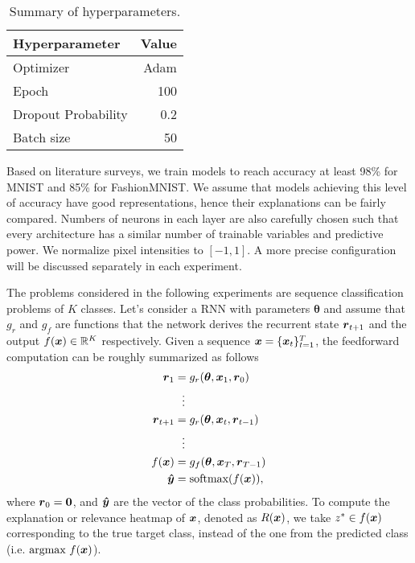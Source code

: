 \begin{table}[!htb]
\centering
\caption{Summary of hyperparameters.}
\label{tab:hyper_summary}
\begin{tabular}{l|r}
\textbf{Hyperparameter} & \multicolumn{1}{l}{\textbf{Value}} \\ \hline
Optimizer               & Adam                               \\
Epoch     & 100                                \\
Dropout Probability     & 0.2                               \\
Batch size              & 50                                
\end{tabular}

\end{table}



  Based on literature surveys, we train models to reach accuracy at least  98\% for MNIST and 85\% for FashionMNIST.  We assume that models achieving this level of accuracy have good representations, hence their explanations can be fairly compared. Numbers of neurons in each layer are also carefully chosen such that every architecture has a similar number of trainable variables and predictive power. We normalize pixel intensities to $[-1,1]$. A more precise configuration will be discussed separately in each experiment. 

The problems considered in the following experiments are sequence classification problems of $K$ classes. Let's consider a RNN with parameters $\boldsymbol{\theta}$ and assume that $g_r$ and $g_{f}$ are functions that the network derives the recurrent state $\patvector{r}_{t+1}$ and the output $f(\boldsymbol{x}) \in \mathbb{R}^K$ respectively. Given a sequence $\boldsymbol{x}= \{ \boldsymbol{x}_t \}_{t=1}^T$, the feedforward computation can be roughly summarized as follows
 \begin{align*}
  	\patvector{r}_{1} &= g_r(\patvector{\theta}, \patvector{x}_1, \patvector{r}_0) \\
  	&\ \ \vdots\\
 	\patvector{r}_{t+1} &= g_r(\patvector{\theta}, \patvector{x}_t, \patvector{r}_{t-1}) \\
 	 &\ \ \vdots\\
f(\x) &= g_{f}(\patvector{\theta}, \patvector{x}_{T},  \patvector{r}_{T-1}) \\
 	\patvector{\hat{y}} &= \text{softmax}(f(\x)),
 \end{align*}
 where $\patvector{r}_0 = \patvector{0}$, and $\patvector{\hat{y}}$ are the vector of the class probabilities. To compute the explanation or relevance heatmap of $\boldsymbol{x}$, denoted as $R(\boldsymbol{x})$, we take $z^* \in f(\boldsymbol{x})$ corresponding to the true target class, instead of the one from the predicted class (i.e. $\underset{}{\text{argmax}}\  f(\boldsymbol{x})$).  
 

